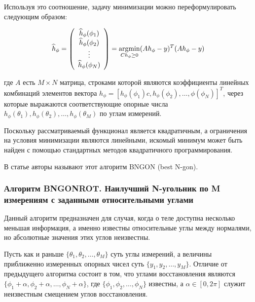 \documentclass[a4paper, 12pt, titlepage]{article}
\theoremstyle{definition}
\theoremstyle{plain}
\theoremstyle{plain}
\begin{document}
Используя это соотношение, задачу минимизации можно переформулировать следующим
образом:

\begin{equation}
\widehat{h}_{\phi} = \left(
\begin{array}{c}
 \widehat{h}_{\phi}(\phi_{1}) \\
 \widehat{h}_{\phi}(\phi_{2}) \\
 \vdots \\
 \widehat{h}_{\phi}(\phi_{N}) \\
\end{array}
\right) = \operatornamewithlimits{argmin}_{C h_{\phi} \geq 0} (A h_{\phi} -
y)^{T} (A h_{\phi} - y)
\end{equation}

где $A$ есть $M \times N$ матрица, строками которой являются коэффициенты
линейных комбинаций элементов вектора $h_{\phi} = [h_{\phi}(\phi_{1})c,
h_{\phi}(\phi_{2}), \ldots, {\phi}(\phi_{N})]^{T}$, через которые
выражаются соответствующие опорные числа $h_{\phi}(\theta_{1}),
h_{\phi}(\theta_{2}), \ldots, h_{\phi}(\theta_{M})$ по углам измерений.

Поскольку рассматриваемый функционал является квадратичным, а ограничения на
условия минимизации являются линейными, искомый минимум может быть найден с
помощью стандартных методов квадратичного программирования.

В статье авторы называют этот алгоритм BNGON (best N-gon).

\subsubsection{Алгоритм BNGONROT. Наилучший N-угольник по M измерениям с
заданными относительными углами}
\label{sec:history/LeleKW92/algo-BNGONROT}

Данный алгоритм предназначен для случая, когда о теле доступна несколько
меньшая информация, а именно известны относительные углы между нормалями, но
абсолютные значения этих углов неизвестны.

Пусть как и раньше $\{\theta_{1}, \theta_{2}, \ldots,
\theta_{M}\}$ суть углы измерений, а величины приближенно измеренных опорных
чисел суть $\{y_{1}, y_{2}, \ldots, y_{M}\}$. Отличие от предыдущего алгоритма 
состоит в том, что углами восстановления являются $\{\phi_{1} + \alpha,
\phi_{2} + \alpha, \ldots, \phi_{N} + \alpha\}$, где $\{\phi_{1}, \phi_{2},
\ldots, \phi_{N}\}$ известны, а $\alpha \in [0, 2 \pi]$ служит неизвестным
смещением углов восстановления.
\end{document}
